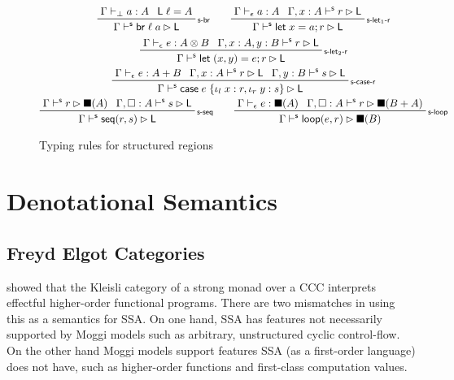\documentclass[acmsmall,screen,review]{acmart}
\newcommand{\ms}[1]{\ensuremath{\mathsf{#1}}}
\newcommand{\lto}{:}
\newcommand{\linl}[1]{\iota_l\;{#1}}
\newcommand{\linr}[1]{\iota_r\;{#1}}
\newcommand{\letstmt}[3]{\ensuremath{\ms{let}\;#1 = #2; #3}}
\newcommand{\brb}[2]{\ms{br}\;#1\;#2}
\newcommand{\casestmt}[5]{\ms{case}\;#1\;\{\linl{#2} \lto #3, \linr{#4} \lto #5\}}
\newcommand{\bhyp}[2]{#1 : #2}
\newcommand{\rle}[1]{{\scriptsize\textsf{#1}}}
\newcommand{\hasty}[4]{#1 \vdash_{#2} #3: {#4}}
\newcommand{\shaslb}[3]{#1 \vdash^{\ms{s}} #2 \rhd #3}
\newcommand{\invar}{\square}
\newcommand{\outlb}{\blacksquare}
\begin{document}
\begin{figure}
  \begin{gather*}
    \prftree[r]{\rle{s-br}}{\hasty{\Gamma}{\bot}{a}{A}}{\ms{L}\;\ell = A}
      {\shaslb{\Gamma}{\brb{\ell}{a}}{\ms{L}}} \qquad
    \prftree[r]{\rle{s-let$_1$-r}}
      {\hasty{\Gamma}{\epsilon}{a}{A}}
      {\shaslb{\Gamma, \bhyp{x}{A}}{r}{\ms{L}}}
      {\shaslb{\Gamma}{\letstmt{x}{a}{r}}{\ms{L}}} \\
    \prftree[r]{\rle{s-let$_2$-r}}
      {\hasty{\Gamma}{\epsilon}{e}{A \otimes B}}
      {\shaslb{\Gamma, \bhyp{x}{A}, \bhyp{y}{B}}{r}{\ms{L}}}
      {\shaslb{\Gamma}{\letstmt{(x, y)}{e}{r}}{\ms{L}}} \\
    \prftree[r]{\rle{s-case-r}}
      {\hasty{\Gamma}{\epsilon}{e}{A + B}}
      {\shaslb{\Gamma, \bhyp{x}{A}}{r}{\ms{L}}}
      {\shaslb{\Gamma, \bhyp{y}{B}}{s}{\ms{L}}}
      {\shaslb{\Gamma}{\casestmt{e}{x}{r}{y}{s}}{\ms{L}}} \\
    \prftree[r]{\rle{s-seq}}
      {\shaslb{\Gamma}{r}{\outlb(A)}}
      {\shaslb{\Gamma, \bhyp{\invar}{A}}{s}{\ms{L}}}
      {\shaslb{\Gamma}{\ms{seq}(r, s)}{\ms{L}}} \qquad
    \prftree[r]{\rle{s-loop}}
      {\hasty{\Gamma}{\epsilon}{e}{\outlb(A)}}
      {\shaslb{\Gamma, \bhyp{\invar}{A}}{r}{\outlb(B + A)}}
      {\shaslb{\Gamma}{\ms{loop}(e, r)}{\outlb(B)}}
  \end{gather*}
  \caption{Typing rules for structured regions}
  \Description{}
  \label{fig:structured-regions}
\end{figure}

\section{Denotational Semantics}

\label{sec:densem}

\subsection{Freyd Elgot Categories}

\citet{moggi-91-monad} showed that the Kleisli category of a strong
monad over a CCC interprets effectful higher-order functional
programs. There are two mismatches in using this as a semantics for
SSA. On one hand, SSA has features not necessarily supported by Moggi
models such as arbitrary, unstructured cyclic control-flow. On the
other hand Moggi models support features SSA (as a first-order
language) does not have, such as higher-order functions and
first-class computation values.
\end{document}
